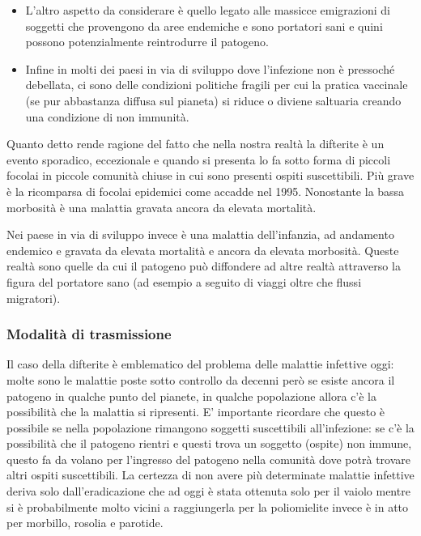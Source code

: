 \begin{itemize}
\item
  L'altro aspetto da considerare è quello legato alle massicce
  emigrazioni di soggetti che provengono da aree endemiche e sono
  portatori sani e quini possono potenzialmente reintrodurre il
  patogeno.
\item
  Infine in molti dei paesi in via di sviluppo dove l'infezione non è
  pressoché debellata, ci sono delle condizioni politiche fragili per
  cui la pratica vaccinale (se pur abbastanza diffusa sul pianeta) si
  riduce o diviene saltuaria creando una condizione di non immunità.
\end{itemize}

  Quanto detto rende ragione del fatto che nella nostra realtà la
  difterite è un evento sporadico, eccezionale e quando si presenta lo
  fa sotto forma di piccoli focolai in piccole comunità chiuse in cui
  sono presenti ospiti suscettibili. Più grave è la ricomparsa di
  focolai epidemici come accadde nel 1995. Nonostante la bassa morbosità
  è una malattia gravata ancora da elevata mortalità.

  Nei paese in via di sviluppo invece è una malattia dell'infanzia, ad
  andamento endemico e gravata da elevata mortalità e ancora da elevata
  morbosità. Queste realtà sono quelle da cui il patogeno può diffondere
  ad altre realtà attraverso la figura del portatore sano (ad esempio a
  seguito di viaggi oltre che flussi migratori).
  
\subsubsection{Modalità di trasmissione}

  Il caso della difterite è emblematico del problema delle malattie
  infettive oggi: molte sono le malattie poste sotto controllo da
  decenni però se esiste ancora il patogeno in qualche punto del
  pianete, in qualche popolazione allora c'è la possibilità che la
  malattia si ripresenti. E' importante ricordare che questo è possibile
  se nella popolazione rimangono soggetti suscettibili all'infezione: se
  c'è la possibilità che il patogeno rientri e questi trova un soggetto
  (ospite) non immune, questo fa da volano per l'ingresso del patogeno
  nella comunità dove potrà trovare altri ospiti suscettibili. La
  certezza di non avere più determinate malattie infettive deriva solo
  dall'eradicazione che ad oggi è stata ottenuta solo per il vaiolo
  mentre si è probabilmente molto vicini a raggiungerla per la
  poliomielite invece è in atto per morbillo, rosolia e parotide.

